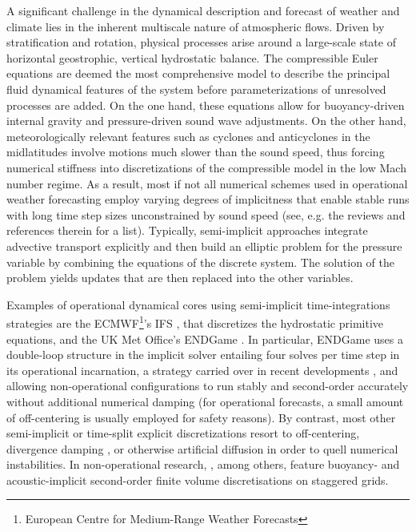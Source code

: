 \documentclass{ametsoc}
\theoremstyle{definition}
\begin{document}
A significant challenge in the dynamical description and forecast of weather and climate lies in the inherent multiscale nature of atmospheric flows. Driven by stratification and rotation, physical processes arise around a large-scale state of horizontal geostrophic, vertical hydrostatic balance. The compressible Euler equations are deemed the most comprehensive model to describe the principal fluid dynamical features of the system before parameterizations of unresolved processes are added. On the one hand, these equations allow for buoyancy-driven internal gravity and pressure-driven sound wave adjustments.  On the other hand, meteorologically relevant features such as cyclones and anticyclones in the midlatitudes involve motions much slower than the sound speed, thus forcing numerical stiffness into discretizations of the compressible model in the low Mach number regime. As a result, most if not all numerical schemes used in operational weather forecasting employ varying degrees of implicitness that enable stable runs with long time step sizes unconstrained by sound speed (see, e.g. the reviews \cite{MarrasEtAl2016, MengaldoEtAl2018} and references therein for a list). Typically, semi-implicit approaches integrate advective transport explicitly and then build an elliptic problem for the pressure variable by combining the equations of the discrete system. The solution of the problem yields updates that are then replaced into the other variables. 

Examples of operational dynamical cores using semi-implicit time-integrations strategies are the ECMWF\footnote{European Centre for Medium-Range Weather Forecasts}'s IFS \citep{Hortal2002}, that discretizes the hydrostatic primitive equations, and the UK Met Office's ENDGame \citep{WoodEtAl2013, BenacchioWood2016}. In particular, ENDGame  uses a double-loop structure in the implicit solver entailing four solves per time step in its operational incarnation, a strategy carried over in recent developments \citep{MelvinEtAl2018}, and allowing non-operational configurations to run stably and second-order accurately without additional numerical damping (for operational forecasts, a small amount of off-centering is usually employed for safety reasons). By contrast, most other semi-implicit or time-split explicit discretizations resort to off-centering, divergence damping \citep{BryanFritsch2002}, or otherwise artificial diffusion in order to quell numerical instabilities. In non-operational research, \cite{DumbserEtAl2018}, among others, feature buoyancy- and acoustic-implicit second-order finite volume discretisations on staggered grids.
\end{document}
